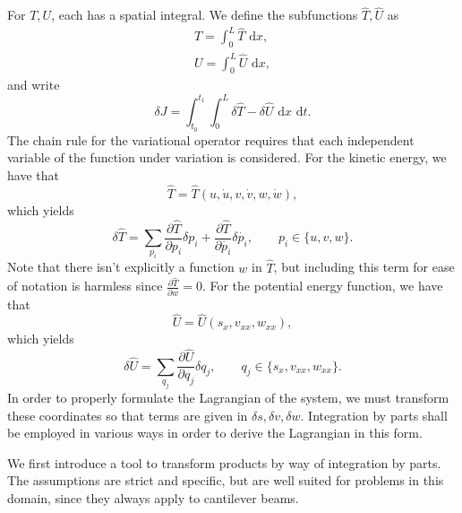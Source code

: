 For $T,U$, each has a spatial integral. We define the subfunctions $\hat T, \hat U$ as
\begin{eqnarray}
T = \int_0^L \hat T \text{ d}x, \\
U = \int_0^L \hat U \text{ d}x,
\end{eqnarray}
and write
\begin{equation}
\delta J = \int_{t_0}^{t_1}\int_{0}^{L}\delta\hat T - \delta\hat U\text{ d}x\text{ d}t.
\end{equation}
The chain rule for the variational operator requires that each independent variable of the function under variation is considered. For the kinetic energy, we have that
\begin{equation}
\hat T = \hat T(u,\dot u,v,\dot v,w,\dot w),
\end{equation}
which yields 
\begin{equation}
\delta \hat T = \sum_{p_i}\frac{\partial \hat T}{\partial p_i}\delta p_i+\frac{\partial \hat T}{\partial \dot{p_i}}\delta \dot{p_i},\qquad p_i\in\{u,v,w\}.
\end{equation}
Note that there isn't explicitly a function $w$ in $\hat T$, but including this term for ease of notation is harmless since $\frac{\partial\hat T}{\partial w}=0$. For the potential energy function, we have that
\begin{equation}
\hat U = \hat U(s_x,v_{xx},w_{xx}),
\end{equation}
which yields 
\begin{equation}
\delta \hat U = \sum_{q_j}\frac{\partial \hat U}{\partial q_j}\delta q_j,\qquad q_j\in\{s_x,v_{xx},w_{xx}\}.
\end{equation}
In order to properly formulate the Lagrangian of the system, we must transform these coordinates so that terms are given in $\delta s,\delta v,\delta w$. Integration by parts shall be employed in various ways in order to derive the Lagrangian in this form.

We first introduce a tool to transform products by way of integration by parts. The assumptions are strict and specific, but are well suited for problems in this domain, since they always apply to cantilever beams.

